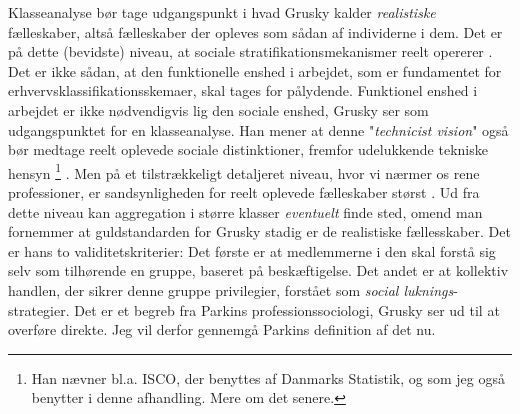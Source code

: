 Klasseanalyse bør tage udgangspunkt i hvad Grusky kalder \emph{realistiske} fælleskaber, altså fælleskaber der opleves som sådan af individerne i dem. Det er på dette (bevidste) niveau, at sociale stratifikationsmekanismer reelt opererer \parencite[212]{Grusky2001}. Det er ikke sådan, at den funktionelle enshed i arbejdet, som er fundamentet for erhvervsklassifikationsskemaer, skal tages for pålydende. Funktionel enshed i arbejdet er ikke nødvendigvis lig den sociale enshed, Grusky ser som udgangspunktet for en klasseanalyse. Han mener at denne "\emph{technicist vision}" %
\label{gruskytechnicistvision}%
også bør medtage reelt oplevede sociale distinktioner, fremfor udelukkende tekniske hensyn \parencite[215:fodnote 5]{Grusky2001}%
%
\footnote{Han nævner bl.a. ISCO, der benyttes af Danmarks Statistik, og som jeg også benytter i denne afhandling. Mere om det senere.}%
%
. Men på et tilstrækkeligt detaljeret niveau, hvor vi nærmer os rene professioner, er sandsynligheden for reelt oplevede fælleskaber størst \parencite[207]{Grusky2001}. Ud fra dette niveau kan aggregation i større klasser \emph{eventuelt} finde sted, omend man fornemmer at guldstandarden for Grusky stadig er de realistiske fællesskaber. Det er hans to validitetskriterier: Det første er at medlemmerne i den skal forstå sig selv som tilhørende en gruppe, baseret på beskæftigelse. Det andet er at kollektiv handlen, der sikrer denne gruppe privilegier, forstået som \emph{social luknings}-strategier. Det er et begreb fra Parkins professionssociologi, Grusky ser ud til at overføre direkte. Jeg vil derfor gennemgå Parkins definition af det nu. 

